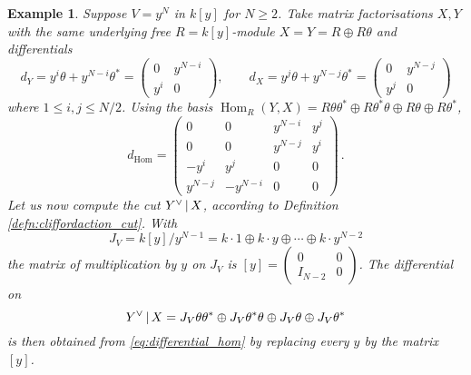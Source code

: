 \documentclass[english,letter paper,12pt,leqno]{article}
\theoremstyle{example}
\newtheorem{example}[theorem]{Example}
\numberwithin{equation}{section}
\def\Hom{\operatorname{Hom}}
\def\be{\begin{equation}}
\def\ee{\end{equation}}
\begin{document}
\begin{example} Suppose $V = y^N$ in $k[y]$ for $N \ge 2$. Take matrix factorisations $X,Y$ with the same underlying free $R = k[y]$-module $X = Y = R \oplus R \theta$ and differentials
\[
d_Y = y^i \theta + y^{N-i} \theta^* = \begin{pmatrix} 0 & y^{N-i} \\ y^i & 0 \end{pmatrix}, \qquad d_X = y^j \theta + y^{N-j} \theta^* = \begin{pmatrix} 0 & y^{N-j}\\ y^j & 0 \end{pmatrix}
\]
where $1 \le i,j \le N/2$. Using the basis $\Hom_R(Y,X) = R \theta \theta^* \oplus R \theta^* \theta \oplus R\theta \oplus R \theta^*$,
\begin{equation}\label{eq:differential_hom}
d_{\Hom} = \begin{pmatrix} 0 & 0 & y^{N-i} & y^j \\ 
0 & 0 & y^{N-j} & y^i \\
-y^i & y^j & 0 & 0 \\
y^{N-j} & -y^{N-i} & 0 & 0 \end{pmatrix}\,.
\end{equation}
Let us now compute the cut $Y^{\vee} \,|\, X$, according to Definition \ref{defn:cliffordaction_cut}. With
\be\label{eq:examplecut_basis2}
J_V = k[y]/y^{N-1} = k \cdot 1 \oplus k \cdot y \oplus \cdots \oplus k \cdot y^{N-2}
\ee
the matrix of multiplication by $y$ on $J_V$ is $[y] = \begin{pmatrix} 0 & 0\\ I_{N-2} & 0 \end{pmatrix}$. The differential on
\be\label{eq:examplecut_basis}
Y^{\vee} \l X = J_V \theta \theta^* \oplus J_V \theta^* \theta \oplus J_V\theta \oplus J_V \theta^*
\ee
is then obtained from \eqref{eq:differential_hom} by replacing every $y$ by the matrix $[y]$.


\end{example}
\end{document}

